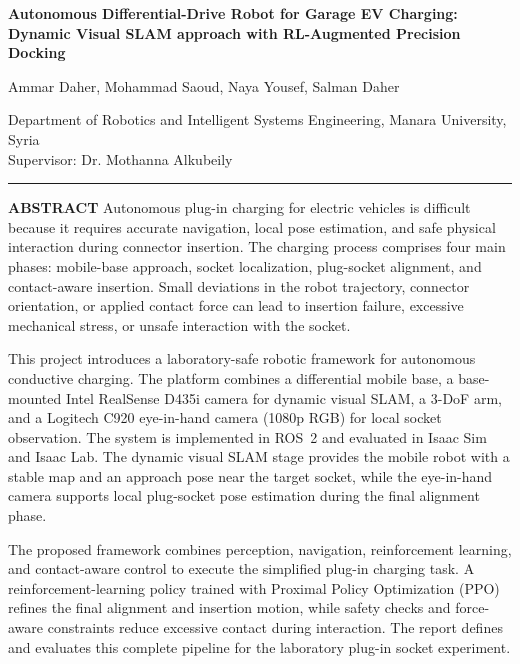 \documentclass[10pt]{article}
\begin{document}
\noindent\begin{minipage}{\textwidth}
\centering\LARGE\bfseries Autonomous \textbf{Differential-Drive Robot for Garage EV Charging: Dynamic Visual SLAM approach with RL-Augmented Precision Docking}\par
\end{minipage}\vspace{0.35em}

\begin{center}
{\large Ammar Daher, Mohammad Saoud, Naya Yousef, Salman Daher}\\\vspace{0.15em}

{\normalsize Department of Robotics and Intelligent Systems Engineering, Manara University, Syria}\\[0.2em]
{\normalsize Supervisor: Dr. Mothanna Alkubeily}
\end{center}\vspace{0.5em}

\noindent\rule{\textwidth}{0.35pt}\vspace{0.6em}

\noindent \textcolor{accessblue}{\bfseries ABSTRACT}\quad
Autonomous plug-in charging for electric vehicles is difficult because it requires accurate navigation, local pose estimation, and safe physical interaction during connector insertion. The charging process comprises four main phases: mobile-base approach, socket localization, plug-socket alignment, and contact-aware insertion. Small deviations in the robot trajectory, connector orientation, or applied contact force can lead to insertion failure, excessive mechanical stress, or unsafe interaction with the socket.

This project introduces a laboratory-safe robotic framework for autonomous conductive charging. The platform combines a differential mobile base, a base-mounted Intel RealSense D435i camera for dynamic visual SLAM, a 3-DoF arm, and a Logitech C920 eye-in-hand camera (1080p RGB) for local socket observation. The system is implemented in ROS~2 and evaluated in Isaac Sim and Isaac Lab. The dynamic visual SLAM stage provides the mobile robot with a stable map and an approach pose near the target socket, while the eye-in-hand camera supports local plug-socket pose estimation during the final alignment phase.

The proposed framework combines perception, navigation, reinforcement learning, and contact-aware control to execute the simplified plug-in charging task. A reinforcement-learning policy trained with Proximal Policy Optimization (PPO) refines the final alignment and insertion motion, while safety checks and force-aware constraints reduce excessive contact during interaction. The report defines and evaluates this complete pipeline for the laboratory plug-in socket experiment.
\vspace{0.5em}
\end{document}
